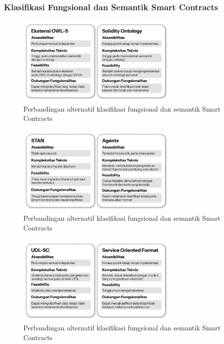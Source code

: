 \subsubsection{Klasifikasi Fungsional dan Semantik Smart Contracts}

\begin{figure}[ht]
	\centering
	\includegraphics[width=0.7\textwidth]{resources/chapter-3/klasifikasi - 1.png}
	\caption{Perbandingan alternatif klasifikasi fungsional dan semantik Smart Contracts}
    \label{image:klasifikasi-1}
\end{figure}

\begin{figure}[ht]
	\centering
	\includegraphics[width=0.7\textwidth]{resources/chapter-3/klasifikasi - 2.png}
	\caption{Perbandingan alternatif klasifikasi fungsional dan semantik Smart Contracts}
    \label{image:klasifikasi-2}
\end{figure}

\begin{figure}[ht]
	\centering
	\includegraphics[width=0.7\textwidth]{resources/chapter-3/klasifikasi - 3.png}
	\caption{Perbandingan alternatif klasifikasi fungsional dan semantik Smart Contracts}
    \label{image:klasifikasi-3}
\end{figure}

